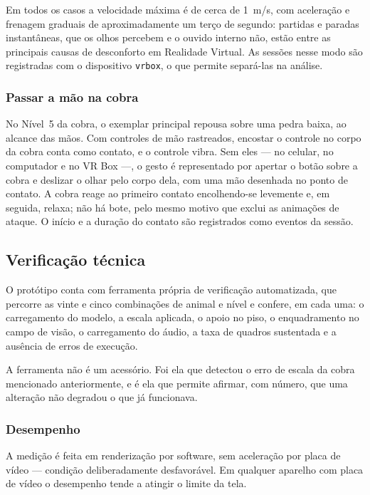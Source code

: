 Em todos os casos a velocidade máxima é de cerca de 1~m/s, com
aceleração e frenagem graduais de aproximadamente um terço de segundo:
partidas e paradas instantâneas, que os olhos percebem e o ouvido interno
não, estão entre as principais causas de desconforto em Realidade
Virtual. As sessões nesse modo são registradas com o dispositivo
\texttt{vrbox}, o que permite separá-las na análise.

\subsubsection{Passar a mão na cobra}

No Nível~5 da cobra, o exemplar principal repousa sobre uma pedra baixa,
ao alcance das mãos. Com controles de mão rastreados, encostar o
controle no corpo da cobra conta como contato, e o controle vibra. Sem
eles --- no celular, no computador e no VR Box ---, o gesto é
representado por apertar o botão sobre a cobra e deslizar o olhar pelo
corpo dela, com uma mão desenhada no ponto de contato. A cobra reage ao
primeiro contato encolhendo-se levemente e, em seguida, relaxa; não há
bote, pelo mesmo motivo que exclui as animações de ataque. O início e a
duração do contato são registrados como eventos da sessão.

\subsection{Verificação técnica}
\label{sec:verificacao}

O protótipo conta com ferramenta própria de verificação automatizada,
que percorre as vinte e cinco combinações de animal e nível e confere, em
cada uma: o carregamento do modelo, a escala aplicada, o apoio no piso, o
enquadramento no campo de visão, o carregamento do áudio, a taxa de
quadros sustentada e a ausência de erros de execução.

A ferramenta não é um acessório. Foi ela que detectou o erro de escala da
cobra mencionado anteriormente, e é ela que permite afirmar, com número,
que uma alteração não degradou o que já funcionava.

\subsubsection{Desempenho}

A medição é feita em renderização por software, sem aceleração por placa
de vídeo --- condição deliberadamente desfavorável. Em qualquer aparelho
com placa de vídeo o desempenho tende a atingir o limite da tela.

